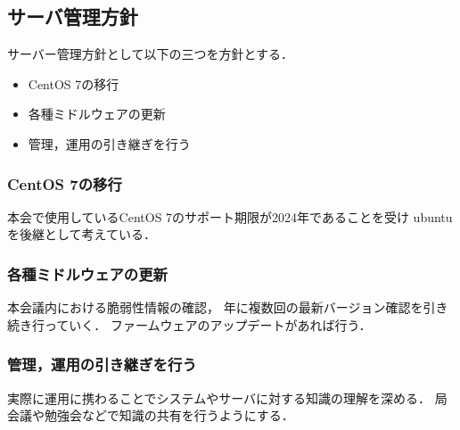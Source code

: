 \subsection*{サーバ管理方針}


サーバー管理方針として以下の三つを方針とする．
\begin{itemize}
    \item CentOS 7の移行
    \item 各種ミドルウェアの更新
    \item 管理，運用の引き継ぎを行う
\end{itemize}

\subsubsection*{CentOS 7の移行}
本会で使用しているCentOS 7のサポート期限が2024年であることを受け
ubuntuを後継として考えている．


\subsubsection*{各種ミドルウェアの更新}
本会議内における脆弱性情報の確認，
年に複数回の最新バージョン確認を引き続き行っていく．
ファームウェアのアップデートがあれば行う．


\subsubsection*{管理，運用の引き継ぎを行う}
実際に運用に携わることでシステムやサーバに対する知識の理解を深める．
局会議や勉強会などで知識の共有を行うようにする．

